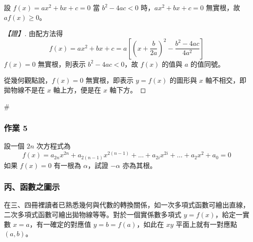 \begin{example}\label{ex:b6s-2-5}
設 $f(x)=ax^2+bx+c=0$ 當 $b^2-4ac < 0$ 時，$ax^2+bx+c=0$ 無實根，故 $a f(x) \ge 0$。
\end{example}

\begin{proof}[【證】]
由配方法得
\[ f(x) = ax^2+bx+c = a \left[ \left(x+\dfrac{b}{2a}\right)^2 - \dfrac{b^2-4ac}{4a^2} \right] \]
$f(x)=0$ 無實根，則表示 $b^2-4ac < 0$，故 $f(x)$ 的值與 $a$ 的值同號。

\begin{figure}[H]
\centering
{}
\end{figure}
從幾何觀點說，$f(x)=0$ 無實根，即表示 $y=f(x)$ 的圖形與 $x$ 軸不相交，即拋物線不是在 $x$ 軸上方，便是在 $x$ 軸下方。
\end{proof}\hfill$\#$

\subsubsection*{作業 5}\label{hw:b6s-2-5}
設一個 $2n$ 次方程式為
\[ f(x) = a_{2n} x^{2n} + a_{2(n-1)} x^{2(n-1)} + \dots + a_{2i} x^{2i} + \dots + a_2 x^2 + a_0 = 0 \]
如果 $f(x)=0$ 有一根為 $\alpha$，試證 $-\alpha$ 亦為其根。

\subsubsection*{丙、函數之圖示}\label{subsec:b6s-2-2-c}

在三、四冊裡讀者已熟悉幾何與代數的轉換關係，如一次多項式函數可繪出直線，二次多項式函數可繪出拋物線等等。對於一個實係數多項式 $y=f(x)$，給定一實數 $x=a$，有一確定的對應值 $y=b=f(a)$，如此在 $xy$ 平面上就有一對應點 $(a, b)$。

